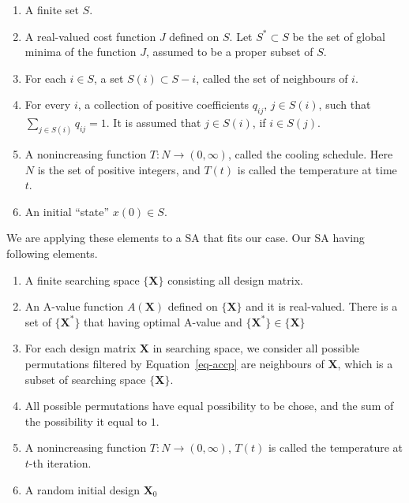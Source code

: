 \documentclass[
  a4paper,
  oneside,
  openany,
  12pt,
  onecolumn]{book}
\providecommand{\tightlist}{%
  \setlength{\itemsep}{0pt}\setlength{\parskip}{0pt}}\usepackage{longtable,booktabs,array}
\theoremstyle{definition}
\theoremstyle{plain}
\theoremstyle{remark}
\begin{document}
\begin{enumerate}
\def\labelenumi{\arabic{enumi}.}
\tightlist
\item
  A finite set \(S\).
\item
  A real-valued cost function \(J\) defined on \(S\). Let
  \(S^*\subset S\) be the set of global minima of the function \(J\),
  assumed to be a proper subset of \(S\).
\item
  For each \(i\in S\), a set \(S(i) \subset S - {i}\), called the set of
  neighbours of \(i\).
\item
  For every \(i\), a collection of positive coefficients \(q_{ij}\),
  \(j\in S(i)\), such that \(\sum_{j\in S(i)} q_{ij} = 1\). It is
  assumed that \(j\in S(i)\), if \(i \in S(j)\).
\item
  A nonincreasing function \(T:N\rightarrow (0, \infty)\), called the
  cooling schedule. Here \(N\) is the set of positive integers, and
  \(T(t)\) is called the temperature at time \(t\).
\item
  An initial ``state'' \(x(0)\in S\).
\end{enumerate}

We are applying these elements to a SA that fits our case. Our SA having
following elements.

\begin{enumerate}
\def\labelenumi{\arabic{enumi}.}
\tightlist
\item
  A finite searching space \(\{\boldsymbol{X}\}\) consisting all design
  matrix.
\item
  An A-value function \(A(\boldsymbol{X})\) defined on
  \(\{\boldsymbol{X}\}\) and it is real-valued. There is a set of
  \(\{\boldsymbol{X}^*\}\) that having optimal A-value and
  \(\{\boldsymbol{X}^*\}\in \{\boldsymbol{X}\}\)
\item
  For each design matrix \(\boldsymbol{X}\) in searching space, we
  consider all possible permutations filtered by Equation~\ref{eq-accp}
  are neighbours of \(\boldsymbol{X}\), which is a subset of searching
  space \(\{\boldsymbol{X}\}\).
\item
  All possible permutations have equal possibility to be chose, and the
  sum of the possibility it equal to \(1\).
\item
  A nonincreasing function \(T:N\rightarrow (0, \infty)\), \(T(t)\) is
  called the temperature at \(t\)-th iteration.
\item
  A random initial design \(\boldsymbol{X}_0\)
\end{enumerate}
\end{document}

